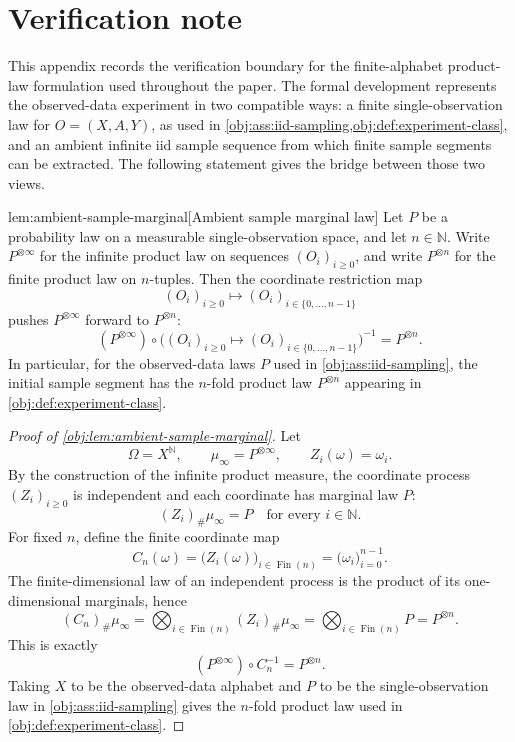 \documentclass[11pt]{article}
\begin{document}
\section{Verification note}

This appendix records the verification boundary for the finite-alphabet product-law formulation used throughout the paper. The formal development represents the observed-data experiment in two compatible ways: a finite single-observation law for \(O=(X,A,Y)\), as used in \cref{obj:ass:iid-sampling,obj:def:experiment-class}, and an ambient infinite iid sample sequence from which finite sample segments can be extracted. The following statement gives the bridge between those two views.

\begin{lemmav}{lem:ambient-sample-marginal}[Ambient sample marginal law]
Let \(P\) be a probability law on a measurable single-observation space, and let \(n\in\mathbb N\). Write \(P^{\otimes\infty}\) for the infinite product law on sequences \((O_i)_{i\ge 0}\), and write \(P^{\otimes n}\) for the finite product law on \(n\)-tuples. Then the coordinate restriction map
\[
(O_i)_{i\ge 0}\longmapsto (O_i)_{i\in\{0,\ldots,n-1\}}
\]
pushes \(P^{\otimes\infty}\) forward to \(P^{\otimes n}\):
\[
(P^{\otimes\infty})\circ\bigl((O_i)_{i\ge 0}\mapsto (O_i)_{i\in\{0,\ldots,n-1\}}\bigr)^{-1}
=
P^{\otimes n}.
\]
In particular, for the observed-data laws \(P\) used in \cref{obj:ass:iid-sampling}, the initial sample segment has the \(n\)-fold product law \(P^{\otimes n}\) appearing in \cref{obj:def:experiment-class}.
\end{lemmav}

\begin{proof}[Proof of \cref{obj:lem:ambient-sample-marginal}]
Let
\[
\Omega=X^{\mathbb N},\qquad
\mu_\infty=P^{\otimes\infty},
\qquad
Z_i(\omega)=\omega_i .
\]
By the construction of the infinite product measure, the coordinate process
\((Z_i)_{i\ge0}\) is independent and each coordinate has marginal law \(P\):
\[
(Z_i)_\#\mu_\infty=P
\quad\text{for every }i\in\mathbb N .
\]
For fixed \(n\), define the finite coordinate map
\[
C_n(\omega)=\bigl(Z_i(\omega)\bigr)_{i\in \operatorname{Fin}(n)}
          =\bigl(\omega_i\bigr)_{i=0}^{n-1}.
\]
The finite-dimensional law of an independent process is the product of its one-dimensional marginals, hence
\[
(C_n)_\#\mu_\infty
=
\bigotimes_{i\in\operatorname{Fin}(n)} (Z_i)_\#\mu_\infty
=
\bigotimes_{i\in\operatorname{Fin}(n)} P
=
P^{\otimes n}.
\]
This is exactly
\[
(P^{\otimes\infty})\circ C_n^{-1}=P^{\otimes n}.
\]
Taking \(X\) to be the observed-data alphabet and \(P\) to be the single-observation law in \cref{obj:ass:iid-sampling} gives the \(n\)-fold product law used in \cref{obj:def:experiment-class}.
\end{proof}
\end{document}
